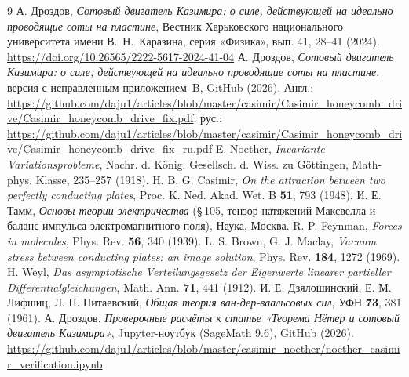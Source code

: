 \documentclass[twoside, 10pt]{article}
\begin{document}
\begin{thebibliography}{9}
А. Дроздов, \textit{Сотовый двигатель Казимира: о силе, действующей на идеально проводящие соты на пластине}, Вестник Харьковского национального университета имени В.~Н.~Каразина, серия «Физика», вып. 41, 28--41 (2024). \url{https://doi.org/10.26565/2222-5617-2024-41-04}
А. Дроздов, \textit{Сотовый двигатель Казимира: о силе, действующей на идеально проводящие соты на пластине}, версия с исправленным приложением~B, GitHub (2026). Англ.: \url{https://github.com/daju1/articles/blob/master/casimir/Casimir_honeycomb_drive/Casimir_honeycomb_drive_fix.pdf}; рус.: \url{https://github.com/daju1/articles/blob/master/casimir/Casimir_honeycomb_drive/Casimir_honeycomb_drive_fix_ru.pdf}
E. Noether, \textit{Invariante Variationsprobleme}, Nachr. d. König. Gesellsch. d. Wiss. zu Göttingen, Math-phys. Klasse, 235–257 (1918).
H. B. G. Casimir, \textit{On the attraction between two perfectly conducting plates}, Proc. K. Ned. Akad. Wet. B \textbf{51}, 793 (1948).
И. Е. Тамм, \textit{Основы теории электричества} (\S\,105, тензор натяжений Максвелла и баланс импульса электромагнитного поля), Наука, Москва.
R. P. Feynman, \textit{Forces in molecules}, Phys. Rev. \textbf{56}, 340 (1939).
L. S. Brown, G. J. Maclay, \textit{Vacuum stress between conducting plates: an image solution}, Phys. Rev. \textbf{184}, 1272 (1969).
H. Weyl, \textit{Das asymptotische Verteilungsgesetz der Eigenwerte linearer partieller Differentialgleichungen}, Math. Ann. \textbf{71}, 441 (1912).
И. Е. Дзялошинский, Е. М. Лифшиц, Л. П. Питаевский, \textit{Общая теория ван-дер-ваальсовых сил}, УФН \textbf{73}, 381 (1961).
А. Дроздов, \textit{Проверочные расчёты к статье «Теорема Нётер и сотовый двигатель Казимира»}, Jupyter-ноутбук (SageMath 9.6), GitHub (2026). \url{https://github.com/daju1/articles/blob/master/casimir_noether/noether_casimir_verification.ipynb}
\end{thebibliography}
\end{document}
